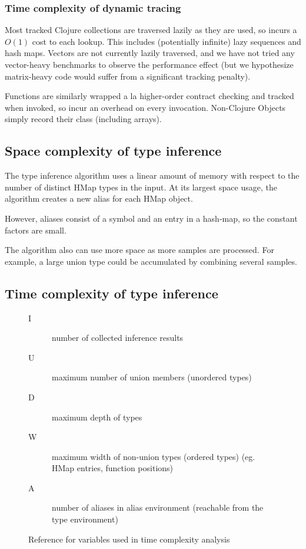 \subsubsection{Time complexity of dynamic tracing}

Most tracked Clojure collections are traversed lazily as they are used,
so incurs a $O(1)$ cost to each lookup.
This includes (potentially infinite) lazy sequences and hash maps.
Vectors are not currently lazily traversed, and we have not tried any vector-heavy
benchmarks to observe the performance effect (but we hypothesize matrix-heavy
code would suffer from a significant tracking penalty).

Functions are similarly wrapped a la higher-order contract checking and tracked when invoked,
so incur an overhead on every invocation.
Non-Clojure Objects simply record their class (including arrays).

\pagebreak

\subsection{Space complexity of type inference}

The type inference algorithm uses a linear amount of memory with respect
to the number of distinct HMap types in the input.
At its largest space usage, the algorithm creates a new alias for each HMap object.

However, aliases consist of a symbol and an entry in a hash-map, so the constant
factors are small.

The algorithm also can use more space as more samples are processed. For example,
a large union type could be accumulated by combining several samples.

\subsection{Time complexity of type inference}

\begin{figure}
\begin{mdframed}
\begin{description}
  \item [I] number of collected inference results
  \item [U] maximum number of union members (unordered types)
  \item [D] maximum depth of types
  \item [W] maximum width of non-union types (ordered types) (eg. HMap entries, function positions)
  \item [A] number of aliases in alias environment (reachable from the type environment)
\end{description}
\end{mdframed}
\caption{Reference for variables used in time complexity analysis}
\label{time-complexity-vars}
\end{figure}

